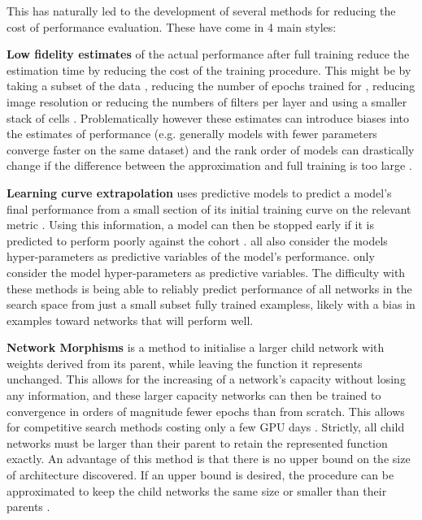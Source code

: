 This has naturally led to the development of several methods for reducing the cost of performance evaluation. These have come in 4 main styles:

\textbf{Low fidelity estimates} of the actual performance after full training reduce the estimation time by reducing the cost of the training procedure. This might be by taking a subset of the data \citep{Klein2016}, reducing the number of epochs trained for \citep{zoph2018learning, Zela2018}, reducing image resolution or reducing the numbers of filters per layer and using a smaller stack of cells \citep{zoph2018learning, Real}. Problematically however these estimates can introduce biases into the estimates of performance (e.g. generally models with fewer parameters converge faster on the same dataset) and the rank order of models can drastically change if the difference between the approximation and full training is too large \citep{Zela2018}.

\textbf{Learning curve extrapolation} uses predictive models to predict a model's final performance from a small section of its initial training curve on the relevant metric \citep{swersky2014raiders,Domhan2015,Klein2016,Baker2017}. Using this information, a model can then be stopped early if it is predicted to perform poorly against the cohort \citep{Domhan2015}. \citet{swersky2014raiders, Domhan2015,Klein2016,Baker2017} all also consider the models hyper-parameters as predictive variables of the model's performance. \citet{liu2018progressive} only consider the model hyper-parameters as predictive variables. The difficulty with these methods is being able to reliably predict performance of all networks in the search space from just a small subset fully trained exampless, likely with a bias in examples toward networks that will perform well.

\textbf{Network Morphisms} \citep{Wei} is a method to initialise a larger child network with weights derived from its parent, while leaving the function it represents unchanged. This allows for the increasing of a network's capacity without losing any information, and these larger capacity networks can then be trained to convergence in orders of magnitude fewer epochs than from scratch. This allows for competitive search methods costing only a few GPU days \citep{Elsken2017, Cai2018, Jin2018}. Strictly, all child networks must be larger than their parent to retain the represented function exactly. An advantage of this method is that there is no upper bound on the size of architecture discovered. If an upper bound is desired, the procedure can be approximated to keep the child networks the same size or smaller than their parents \citep{Elsken2018}.

